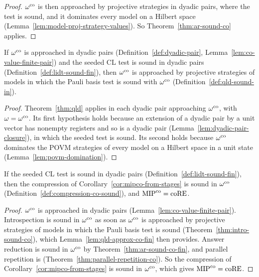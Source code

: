\begin{proof}
\leanok
$\omega^{\mathrm{co}}$ is then approached by projective strategies in dyadic pairs, where the test is sound,
and it dominates every model on a Hilbert space (Lemma~\ref{lem:model-proj-strategy-values}). So
Theorem~\ref{thm:ar-sound-co} applies.
\end{proof}

\begin{lemma}
\label{lem:qld-approx-co-fin}
\leanok
If $\omega^{\mathrm{co}}$ is approached in dyadic pairs (Definition~\ref{def:dyadic-pair},
Lemma~\ref{lem:co-value-finite-pair}) and the seeded CL test is sound in dyadic pairs
(Definition~\ref{def:lidt-sound-fin}), then $\omega^{\mathrm{co}}$ is approached by projective strategies of
models in which the Pauli basis test is sound with $\omega^{\mathrm{co}}$ (Definition~\ref{def:qld-sound-in}).
\end{lemma}

\begin{proof}
\leanok
Theorem~\ref{thm:qld} applies in each dyadic pair approaching $\omega^{\mathrm{co}}$, with
$\omega = \omega^{\mathrm{co}}$. Its first hypothesis holds because an extension of a dyadic pair by a unit
vector has nonempty registers and so is a dyadic pair (Lemma~\ref{lem:dyadic-pair-closure}), in
which the seeded test is sound. Its second holds because $\omega^{\mathrm{co}}$ dominates the POVM strategies of
every model on a Hilbert space in a unit state (Lemma~\ref{lem:povm-domination}).
\end{proof}

\begin{corollary}[$\MIPco = \coRE$, from the soundness of the low-individual-degree test in dyadic pairs]
\label{cor:mipco-from-lidt-fin}
\leanok
If the seeded CL test is sound in dyadic pairs (Definition~\ref{def:lidt-sound-fin}), then the
compression of Corollary~\ref{cor:mipco-from-stages} is sound in $\omega^{\mathrm{co}}$
(Definition~\ref{def:compression-co-sound}), and $\MIPco = \coRE$.
\end{corollary}

\begin{proof}
\leanok
$\omega^{\mathrm{co}}$ is approached in dyadic pairs (Lemma~\ref{lem:co-value-finite-pair}). Introspection is
sound in $\omega^{\mathrm{co}}$ as soon as $\omega^{\mathrm{co}}$ is approached by projective strategies of models in which
the Pauli basis test is sound (Theorem~\ref{thm:intro-sound-co}), which
Lemma~\ref{lem:qld-approx-co-fin} then provides. Answer reduction is sound in $\omega^{\mathrm{co}}$ by
Theorem~\ref{thm:ar-sound-co-fin}, and parallel repetition is
(Theorem~\ref{thm:parallel-repetition-co}). So the compression of
Corollary~\ref{cor:mipco-from-stages} is sound in $\omega^{\mathrm{co}}$, which gives $\MIPco = \coRE$.
\end{proof}

